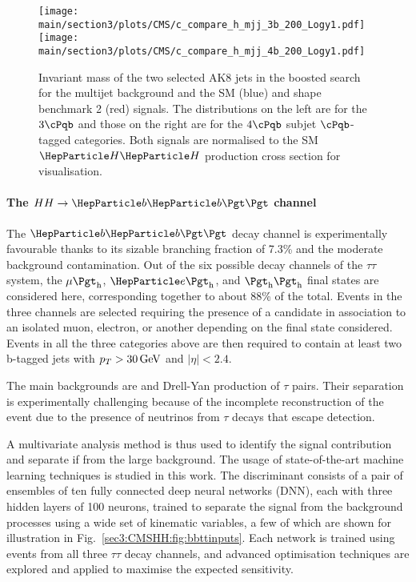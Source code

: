 \begin{figure}[!htb]
\centering 
    \texttt{[image: \\main/section3/plots/CMS/c\_compare\_h\_mjj\_3b\_200\_Logy1.pdf]}
    \texttt{[image: \\main/section3/plots/CMS/c\_compare\_h\_mjj\_4b\_200\_Logy1.pdf]}
\caption{Invariant mass of the two selected AK8 jets in the boosted \bbbb \HH search for the multijet background and the SM (blue) and shape benchmark 2 (red) signals.
    The distributions on the left are for the $3\cPqb$ and those on the right are for the $4\cPqb$ subjet $\cPqb$-tagged categories.
    Both signals are normalised to the SM $\PH\PH$ production cross section for visualisation.} 
\label{sec3:CMSHH:fig:bbbb_boosted} 
\end{figure}



\paragraph{The $HH \rightarrow \bbtt$ channel}

The $\bbtt$ decay channel is experimentally favourable thanks to its sizable branching fraction of 7.3\% and the moderate background contamination.
Out of the six possible decay channels of the $\tau\tau$ system, the $\mu\tauh$, $\Pe\tauh$, and $\tauh\tauh$ final states are considered here, corresponding together to about 88\% of the total.
Events in the three channels are selected requiring the presence of a \tauh candidate in association to an isolated muon, electron, or another \tauh depending on the final state considered.
Events in all the three categories above are then required to contain at least two b-tagged jets with $p_{T} > 30\,\text{Ge\hspace{-.08em}V}$ and $|\eta| < 2.4$. 

The main backgrounds are \ttbar and Drell-Yan production of $\tau$ pairs.
Their separation is experimentally challenging because of the incomplete reconstruction of the event due to the presence of neutrinos from $\tau$ decays that escape detection.

A multivariate analysis method is thus used to identify the signal contribution and separate if from the large background.
The usage of state-of-the-art machine learning techniques is studied in this work.
The discriminant consists of a pair of ensembles of ten fully connected deep neural networks (DNN), each with three hidden layers of 100 neurons, trained to separate the \HH signal from the background processes using a wide set of kinematic variables, a few of which are shown for illustration in Fig.~\ref{sec3:CMSHH:fig:bbttinputs}.
Each network is trained using events from all three $\tau\tau$ decay channels, and advanced optimisation techniques are explored and applied to maximise the expected sensitivity.


